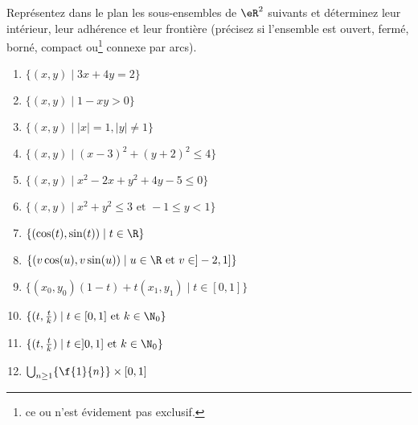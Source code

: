 
\begin{exercice}\label{exo0076}

Représentez dans le plan les sous-ensembles de $\eR^2$ suivants et déterminez leur intérieur, leur adhérence et leur frontière (précisez si l'ensemble est ouvert, fermé, borné, compact ou\footnote{ce \og ou\fg{} n'est évidement pas exclusif.} connexe par arcs).
\begin{enumerate}
\item\label{Item76a} $ \{ (x,y) \mid 3x+4y=2  \} $
\item\label{Item76b}  $ \{ (x,y) \mid 1-xy>0 \} $
\item\label{Item76c}  $ \{ (x,y) \mid |x| =1, |y|\neq1 \} $
\item\label{Item76d}  $ \{ (x,y) \mid (x-3)^2 +(y+2)^2 \leq 4 \} $
\item\label{Item76e}  $ \{ (x,y) \mid x^2 -2x + y^2 + 4y -5 \leq 0 \} $
\item\label{Item76f}  $ \{ (x,y) \mid x^2 + y^2 \leq 3 \mbox{ et } -1 \leq y < 1 \} $
\item\label{Item76g}  $ \{ (\cos(t),\sin(t)) \mid t \in \R \} $
\item\label{Item76h}  $ \{ (v \cos(u),v \sin(u)) \mid u \in \R \mbox{ et } v \in ]-2, 1] \}$
\item\label{Item76i}  $ \{ (x_0,y_0)(1-t) + t(x_1,y_1) \mid t\in [0,1] \} $
\item\label{Item76j}  $ \{ (t,\frac{t}{k}) \mid t\in [0,1] \mbox{ et } k\in \N_0 \} $
\item\label{Item76k}  $ \{ (t,\frac{t}{k}) \mid t\in ]0,1] \mbox{ et } k\in \N_0 \} $
\item\label{Item76l}  $ \bigcup_{n\geq1}\{\f{1}{n}\}\times[0,1]$
\end{enumerate}

\end{exercice}
